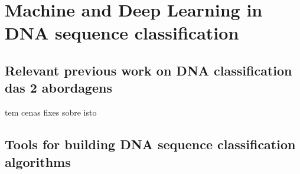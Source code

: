 \chapter{Machine and Deep Learning in DNA sequence classification} \label{sec:ml_dl_dna}

\section{Relevant previous work on DNA classification das 2 abordagens}

\cite{Yang2020ReviewDNA} tem cenas fixes sobre isto


\section{Tools for building DNA sequence classification algorithms}

